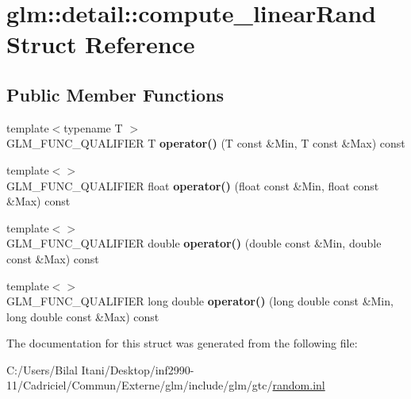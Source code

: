 \hypertarget{structglm_1_1detail_1_1compute__linear_rand}{}\section{glm\+:\+:detail\+:\+:compute\+\_\+linear\+Rand Struct Reference}
\label{structglm_1_1detail_1_1compute__linear_rand}
\subsection*{Public Member Functions}
\begin{DoxyCompactItemize}
\item 
{\footnotesize template$<$typename T $>$ }\\G\+L\+M\+\_\+\+F\+U\+N\+C\+\_\+\+Q\+U\+A\+L\+I\+F\+I\+ER T {\bfseries operator()} (T const \&Min, T const \&Max) const \hypertarget{structglm_1_1detail_1_1compute__linear_rand_ac852e16d66ba80ff5309238b3f494b99}{}\label{structglm_1_1detail_1_1compute__linear_rand_ac852e16d66ba80ff5309238b3f494b99}

\item 
{\footnotesize template$<$$>$ }\\G\+L\+M\+\_\+\+F\+U\+N\+C\+\_\+\+Q\+U\+A\+L\+I\+F\+I\+ER float {\bfseries operator()} (float const \&Min, float const \&Max) const \hypertarget{structglm_1_1detail_1_1compute__linear_rand_aeb6d4f603a9afa05544d65233064f2e9}{}\label{structglm_1_1detail_1_1compute__linear_rand_aeb6d4f603a9afa05544d65233064f2e9}

\item 
{\footnotesize template$<$$>$ }\\G\+L\+M\+\_\+\+F\+U\+N\+C\+\_\+\+Q\+U\+A\+L\+I\+F\+I\+ER double {\bfseries operator()} (double const \&Min, double const \&Max) const \hypertarget{structglm_1_1detail_1_1compute__linear_rand_a60dd37b36082f1a8dbfb8d34f0d5575c}{}\label{structglm_1_1detail_1_1compute__linear_rand_a60dd37b36082f1a8dbfb8d34f0d5575c}

\item 
{\footnotesize template$<$$>$ }\\G\+L\+M\+\_\+\+F\+U\+N\+C\+\_\+\+Q\+U\+A\+L\+I\+F\+I\+ER long double {\bfseries operator()} (long double const \&Min, long double const \&Max) const \hypertarget{structglm_1_1detail_1_1compute__linear_rand_ab5433863c50ed60a1ce5ac941759428f}{}\label{structglm_1_1detail_1_1compute__linear_rand_ab5433863c50ed60a1ce5ac941759428f}

\end{DoxyCompactItemize}


The documentation for this struct was generated from the following file\+:\begin{DoxyCompactItemize}
\item 
C\+:/\+Users/\+Bilal Itani/\+Desktop/inf2990-\/11/\+Cadriciel/\+Commun/\+Externe/glm/include/glm/gtc/\hyperlink{random_8inl}{random.\+inl}\end{DoxyCompactItemize}

